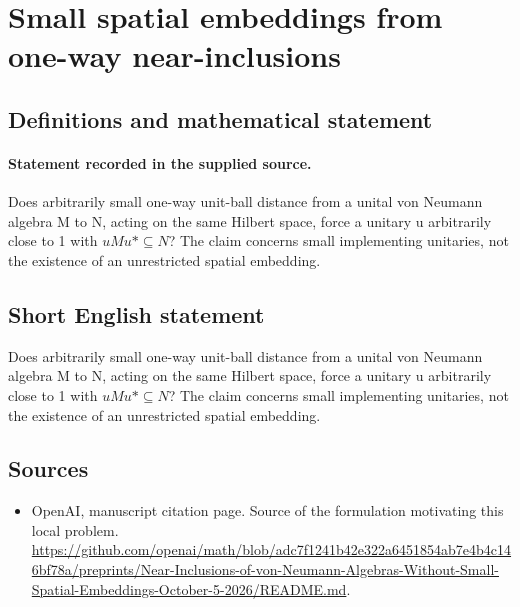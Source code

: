 \documentclass[11pt]{article}
\begin{document}
\section*{Small spatial embeddings from one-way near-inclusions}\label{statement}
\subsection{Definitions and mathematical statement}
\paragraph{Statement recorded in the supplied source.}
Does arbitrarily small one-way unit-ball distance from a unital von Neumann algebra M to N, acting on the same Hilbert space, force a unitary u arbitrarily close to 1 with $uMu*\subseteq N$? The claim concerns small implementing unitaries, not the existence of an unrestricted spatial embedding.
\subsection{Short English statement}
Does arbitrarily small one-way unit-ball distance from a unital von Neumann algebra M to N, acting on the same Hilbert space, force a unitary u arbitrarily close to 1 with $uMu*\subseteq N$? The claim concerns small implementing unitaries, not the existence of an unrestricted spatial embedding.
\subsection{Sources}
\begin{itemize}
\item[S1] OpenAI, manuscript citation page. Source of the formulation motivating this local problem.
\url{https://github.com/openai/math/blob/adc7f1241b42e322a6451854ab7e4b4c146bf78a/preprints/Near-Inclusions-of-von-Neumann-Algebras-Without-Small-Spatial-Embeddings-October-5-2026/README.md}.
\end{itemize}
\end{document}
